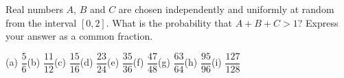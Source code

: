 Real numbers $A$, $B$ and $C$ are chosen independently and uniformly at random from the interval $[0,2]$. What is the probability that $A+B+C>1$? Express your answer as a common fraction.

(a) $\dfrac{5}{6}$\quad (b) $\dfrac{11}{12}$\quad (c) $\dfrac{15}{16}$\quad (d) $\dfrac{23}{24}$\quad (e) $\dfrac{35}{36}$\quad (f) $\dfrac{47}{48}$\quad (g) $\dfrac{63}{64}$\quad (h) $\dfrac{95}{96}$\quad (i) $\dfrac{127}{128}$
